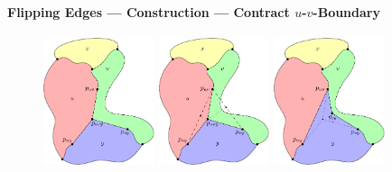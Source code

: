\documentclass[t,18pt]{beamer}
\newcommand{\emdash}{---}
\begin{document}
\begin{frame}[c]
  \frametitle{}
  \framesubtitle{Flipping Edges \emdash{} Construction \emdash{} Contract $u$-$v$-Boundary}
  \begin{figure}
    \includegraphics[width=3.25cm]{../Thesis/Resources/FlipEdge-ContractBoundaryBelow-1.pdf}
    \quad
    \includegraphics[width=3.25cm]{../Thesis/Resources/FlipEdge-ContractBoundaryBelow-2.pdf}
    \quad
    \includegraphics[width=3.25cm]{../Thesis/Resources/FlipEdge-ContractBoundaryBelow-3.pdf}
  \end{figure}
\end{frame}
\end{document}
